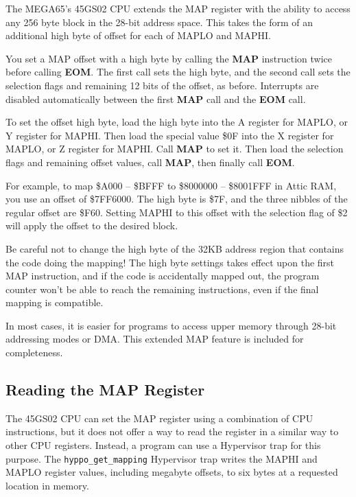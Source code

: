 The MEGA65's 45GS02 CPU extends the MAP register with the ability to access any
256 byte block in the 28-bit address space. This takes the form of an
additional high byte of offset for each of MAPLO and MAPHI.

You set a MAP offset with a high byte by calling the {\bf MAP} instruction twice
before calling {\bf EOM}. The first call sets the high byte, and the second
call sets the selection flags and remaining 12 bits of the offset, as before.
Interrupts are disabled automatically between the first {\bf MAP} call and the
{\bf EOM} call.

To set the offset high byte, load the high byte into the A register for MAPLO,
or Y register for MAPHI. Then load the special value \$0F into the X register
for MAPLO, or Z register for MAPHI. Call {\bf MAP} to set it. Then load the
selection flags and remaining offset values, call {\bf MAP}, then finally call
{\bf EOM}.

For example, to map \$A000 -- \$BFFF to \$8000000 -- \$8001FFF in Attic RAM,
you use an offset of \$7FF6000. The high byte is \$7F, and the three nibbles
of the regular offset are \$F60. Setting MAPHI to this offset with
the selection flag of \$2 will apply the offset to the desired block.


Be careful not to change the high byte of the 32KB address region that contains
the code doing the mapping! The high byte settings takes effect upon the first
MAP instruction, and if the code is accidentally mapped out, the program
counter won't be able to reach the remaining instructions, even if the final
mapping is compatible.

In most cases, it is easier for programs to access upper memory through 28-bit
addressing modes or DMA. This extended MAP feature is included for completeness.

\subsection{Reading the MAP Register}

The 45GS02 CPU can set the MAP register using a combination of CPU
instructions, but it does not offer a way to read the register in a similar
way to other CPU registers. Instead, a program can use a Hypervisor trap
for this purpose. The {\tt hyppo\_get\_mapping} Hypervisor trap writes the MAPHI
and MAPLO register values, including megabyte offsets, to six bytes at a
requested location in memory.

